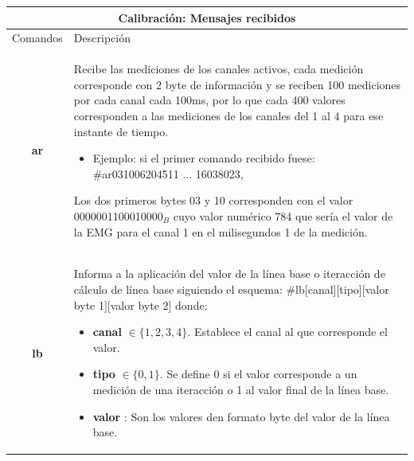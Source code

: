 \begin{table}[!ht]
    \centering
    \begin{tabular}{ |c|p{14cm}|}
        \hline
        \multicolumn{2}{|c|}{Calibración: Mensajes recibidos} \\
        \hline
        Comandos        &   Descripción \\\hline
        \textbf{ar}     &   \begin{minipage}{14cm}
                                \vspace{2pt}    
                                Recibe las mediciones de los canales activos, cada medición corresponde con 2 byte de información y se reciben 100 mediciones por cada canal cada 100ms, por lo que cada 400 valores corresponden a las mediciones de los canales del 1 al 4 para ese instante de tiempo.
                                \begin{itemize}
                                    \item Ejemplo: si el primer comando recibido fuese: \#ar031006204511 ... 16038023,
                                \end{itemize}
                                Los dos primeros bytes 03 y 10 corresponden con el valor 0000001100010000$_{B}$ cuyo valor numérico  784 que sería el valor de la EMG para el canal 1 en el milisegundos 1 de la medición.
                                \vspace{2pt}    
                            \end{minipage}\\\hline    
        \textbf{lb}     &   \begin{minipage}{14cm}
                                \vspace{1pt}
                                Informa a la aplicación del valor de la línea base o iteracción de cálculo de línea base siguiendo el esquema: \#lb[canal][tipo][valor byte 1][valor byte 2] donde:
                                \begin{itemize}
                                    \item \textbf{canal} $\in \{ 1, 2, 3, 4\}$. Establece el canal al que corresponde el valor.
                                    \item \textbf{tipo} $\in \{ 0, 1\}$. Se define 0 si el valor corresponde a un medición de una iteracción o 1 al valor final de la línea base.
                                    \item \textbf{valor} : Son los valores den formato byte del valor de la línea base.  

\end{itemize}
\end{minipage}
\end{tabular}
\end{table}
